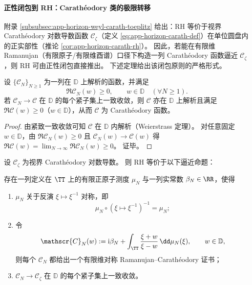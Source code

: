 \paragraph{正性闭包到 RH：Carath\'eodory 类的极限转移}
附录 \ref{subsubsec:app-horizon-weyl-carath-toeplitz} 给出：RH 等价于视界 Carath\'eodory 对数导数函数 \(\mathscr{C}_{\zeta}\)（定义 \eqref{eq:app-horizon-carath-def}）在单位圆盘内的正实部性（推论 \ref{cor:app-horizon-carath-rh}）。
因此，若能在有限维 Ramanujan（有限原子/有限维酉谱）口径下构造一列 Carath\'eodory 函数逼近 \(\mathscr{C}_{\zeta}\)，则 RH 可由正性闭包直接推出。
下述定理给出该闭包原则的严格形式。

\begin{theorem}\label{thm:xi-horizon-carath-closure}
设 \(\{\mathscr{C}_N\}_{N\ge 1}\) 为一列在 \(\mathbb{D}\) 上解析的函数，并满足
\[
\Re \mathscr{C}_N(w)\ge 0,\qquad w\in\mathbb{D}\quad(\forall N\ge 1).
\]
若 \(\mathscr{C}_N\to \mathscr{C}\) 在 \(\mathbb{D}\) 的每个紧子集上一致收敛，则 \(\mathscr{C}\) 亦在 \(\mathbb{D}\) 上解析且满足 \(\Re \mathscr{C}(w)\ge 0\)（\(w\in\mathbb{D}\)），从而 \(\mathscr{C}\) 为 Carath\'eodory 函数。
\end{theorem}

\begin{proof}
由紧致一致收敛可知 \(\mathscr{C}\) 在 \(\mathbb{D}\) 内解析（Weierstrass 定理）。
对任意固定 \(w\in\mathbb{D}\)，由 \(\Re \mathscr{C}_N(w)\ge 0\) 且 \(\mathscr{C}_N(w)\to \mathscr{C}(w)\) 得 \(\Re \mathscr{C}(w)=\lim_{N\to\infty}\Re \mathscr{C}_N(w)\ge 0\)。
证毕。
\end{proof}

\begin{theorem}\label{thm:xi-finite-symmetric-atomic-carath-rh-equivalence}
设 \(\mathscr{C}_{\zeta}\) 为视界 Carath\'eodory 对数导数。
则 RH 等价于以下逼近命题：

存在一列定义在 \(\TT\) 上的有限正原子测度 \(\mu_N\) 与一列实常数 \(\beta_N\in\RR\)，使得
\begin{enumerate}
  \item \(\mu_N\) 关于反演 \(\xi\mapsto \xi^{-1}\) 对称，即
  \[
  \mu_N\circ(\xi\mapsto\xi^{-1})^{-1}=\mu_N;
  \]
  \item 令
  \[
  \mathscr{C}_N(w)
  :=
  \mathrm{i}\beta_N+\int_{\TT}\frac{\xi+w}{\xi-w}\,\dd\mu_N(\xi),
  \qquad
  w\in\mathbb D,
  \]
  则每个 \(\mathscr{C}_N\) 都给出一个有限维对称 Ramanujan--Carath\'eodory 证书；
  \item \(\mathscr{C}_N\to \mathscr{C}_{\zeta}\) 在 \(\mathbb D\) 的每个紧子集上一致收敛。
\end{enumerate}
\end{theorem}

